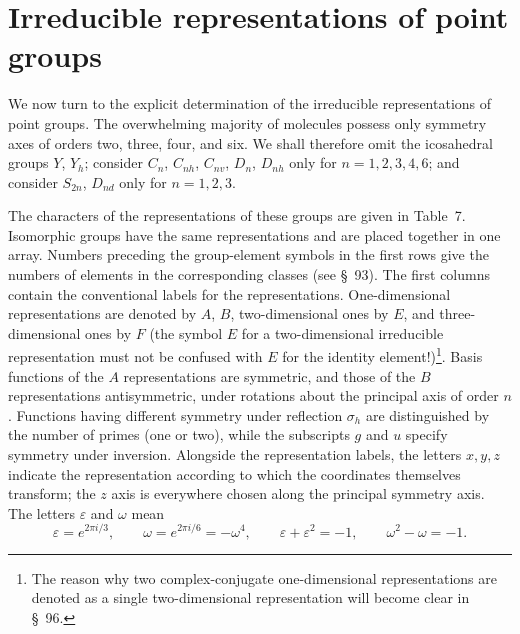 \section{Irreducible representations of point groups}

We now turn to the explicit determination of the irreducible representations of point groups. The overwhelming majority of molecules possess only symmetry axes of orders two, three, four, and six. We shall therefore omit the icosahedral groups $Y$, $Y_h$; consider $C_n$, $C_{nh}$, $C_{nv}$, $D_n$, $D_{nh}$ only for $n=1,2,3,4,6$; and consider $S_{2n}$, $D_{nd}$ only for $n=1,2,3$.

The characters of the representations of these groups are given in Table~7. Isomorphic groups have the same representations and are placed together in one array. Numbers preceding the group-element symbols in the first rows give the numbers of elements in the corresponding classes (see \S~93). The first columns contain the conventional labels for the representations. One-dimensional representations are denoted by $A$, $B$, two-dimensional ones by $E$, and three-dimensional ones by $F$ (the symbol $E$ for a two-dimensional irreducible representation must not be confused with $E$ for the identity element!)\footnote{The reason why two complex-conjugate one-dimensional representations are denoted as a single two-dimensional representation will become clear in \S~96.}. Basis functions of the $A$ representations are symmetric, and those of the $B$ representations antisymmetric, under rotations about the principal axis of order $n$. Functions having different symmetry under reflection $\sigma_h$ are distinguished by the number of primes (one or two), while the subscripts $g$ and $u$ specify symmetry under inversion. Alongside the representation labels, the letters $x,y,z$ indicate the representation according to which the coordinates themselves transform; the $z$ axis is everywhere chosen along the principal symmetry axis. The letters $\varepsilon$ and $\omega$ mean
\[
\varepsilon=e^{2\pi i/3},\qquad \omega=e^{2\pi i/6}=-\omega^4,
\qquad \varepsilon+\varepsilon^2=-1,\qquad \omega^2-\omega=-1.
\]

